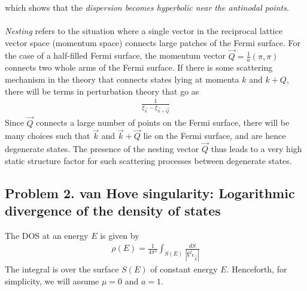 \documentclass[12pt]{article}
\numberwithin{equation}{section}
\begin{document}
which shows that the \textit{dispersion becomes hyperbolic near the antinodal points}.
\\\\
\textit{Nesting} refers to the situation where a single vector in the reciprocal lattice vector space (momentum space) connects large patches of the Fermi surface. For the case of a half-filled Fermi surface, the momentum vector \(\vec Q = \frac{1}{a}\left( \pi, \pi\right)\) connects two whole arms of the Fermi surface. If there is some scattering mechanism in the theory that connects states lying at momenta \(k\) and \(k+Q\), there will be terms in perturbation theory that go as
\begin{equation}\begin{aligned}
	\frac{1}{\xi_{\vec k} - \xi_{\vec k + \vec Q}}
\end{aligned}\end{equation}
Since \(\vec Q\) connects a large number of points on the Fermi surface, there will be many choices such that \(\vec k\) and \(\vec k + \vec Q\) lie on the Fermi surface, and are hence degenerate states. The presence of the nesting vector \(\vec Q\) thus leads to a very high static structure factor for such scattering processes between degenerate states.

\newpage
\subsection*{Problem 2. van Hove singularity: Logarithmic divergence of the density of states}
The DOS at an energy $E$ is given by
\begin{equation}\begin{aligned}
	\rho(E) = \frac{1}{4\pi^2}\int_{S(E)} \frac{dS}{|\vec \nabla \epsilon_{\vec{k}}|}
\end{aligned}\end{equation}
The integral is over the surface \(S(E)\) of constant energy $E$. Henceforth, for simplicity, we will assume \(\mu=0\) and \(a=1\). 
\end{document}
